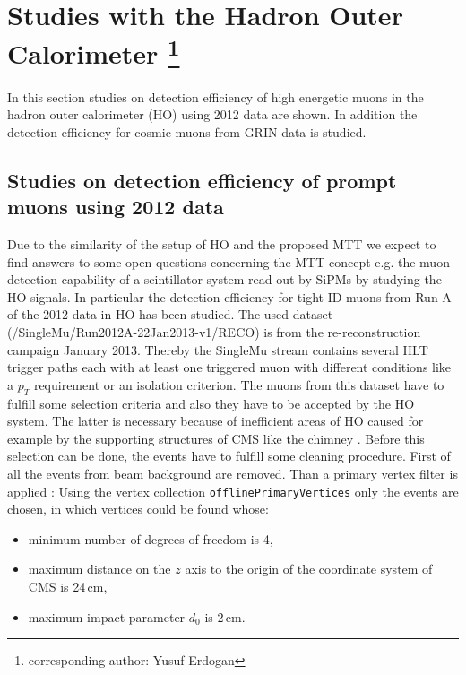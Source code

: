 \section[Studies with the Hadron Outer Calorimeter]{Studies with the Hadron Outer Calorimeter \footnote{corresponding author: Yusuf Erdogan}}
\label{sec:HOstudies}
	In this section studies on detection efficiency of high energetic muons in the hadron outer calorimeter (HO) using 2012 data are shown.
	In addition the detection efficiency for cosmic muons from GRIN data is studied.
	\subsection{Studies on detection efficiency of prompt muons using 2012 data}
		Due to the similarity of the setup of HO and the proposed MTT we expect to find answers to some open questions concerning the MTT concept e.g. the muon detection capability of a
		scintillator system read out by SiPMs by studying the HO signals.
		In particular the detection efficiency for tight ID muons from Run A of the 2012 data in HO has been studied.
		The used dataset (/SingleMu/Run2012A-22Jan2013-v1/RECO) is from the re-reconstruction campaign January 2013.
		Thereby the SingleMu stream contains several HLT trigger paths each with at least one triggered muon with different conditions like a $p_T$ requirement or an isolation criterion.
		The muons from this dataset have to fulfill some selection criteria and also they have to be accepted by the HO system.
		The latter is necessary because of inefficient areas of HO caused for example by the supporting structures of CMS like the chimney \cite{JINST}.
		Before this selection can be done, the events have to fulfill some cleaning procedure.
		First of all the events from beam background are removed.
		Than a primary vertex filter is applied \cite{CMS-PAPER-TRK-11-001}:
		Using the vertex collection \verb+offlinePrimaryVertices+ only the events are chosen, in which vertices could be found whose:
			\begin{itemize}
				\item minimum number of degrees of freedom is 4,
				\item maximum distance on the $z$ axis to the origin of the coordinate system of CMS is 24\,cm,
				\item maximum impact parameter $d_0$ is 2\,cm.
			\end{itemize}
